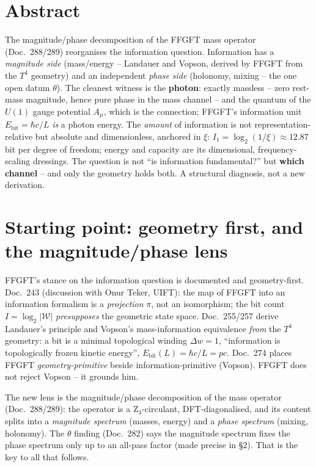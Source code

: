 \section*{Abstract}
The magnitude/phase decomposition of the FFGFT mass operator (Doc.~288/289) reorganises the information
question. Information has a \emph{magnitude side} (mass/energy -- Landauer and Vopson, derived by FFGFT
from the $T^4$ geometry) and an independent \emph{phase side} (holonomy, mixing -- the one open datum
$\theta$). The cleanest witness is the \textbf{photon}: exactly massless -- zero rest-mass magnitude, hence pure phase in the mass channel -- and the quantum of
the $U(1)$ gauge potential $A_\mu$, which is the connection; FFGFT's information unit $E_\text{bit}=\hbar c/L$ \emph{is} a photon
energy. The \emph{amount} of information is not representation-relative but absolute and dimensionless,
anchored in $\xi$: $I_1=\log_2(1/\xi)\approx12.87$ bit per degree of freedom; energy and capacity are its
dimensional, frequency-scaling dressings. The question is not \enquote{is information fundamental?} but
\textbf{which channel} -- and only the geometry holds both. A structural diagnosis, not a new derivation.

\section{Starting point: geometry first, and the magnitude/phase lens}
FFGFT's stance on the information question is documented and geometry-first. Doc.~243 (discussion with
Onur Teker, UIFT): the map of FFGFT into an information formalism is a \emph{projection} $\pi$, not an
isomorphism; the bit count $I=\log_2|\mathcal{W}|$ \emph{presupposes} the geometric state space.
Doc.~255/257 derive Landauer's principle and Vopson's mass-information equivalence \emph{from} the $T^4$
geometry: a bit is a minimal topological winding $\Delta w=1$, \enquote{information is topologically
frozen kinetic energy}, $E_\text{bit}(L)=\hbar c/L=pc$. Doc.~274 places FFGFT \emph{geometry-primitive}
beside information-primitive (Vopson). FFGFT does not reject Vopson -- it grounds him.

The new lens is the magnitude/phase decomposition of the mass operator (Doc.~288/289): the operator is a
Z$_3$-circulant, DFT-diagonalised, and its content splits into a \emph{magnitude spectrum} (masses,
energy) and a \emph{phase spectrum} (mixing, holonomy). The $\theta$ finding (Doc.~282) says the
magnitude spectrum fixes the phase spectrum only up to an all-pass factor (made precise in §2). That is the key to all that follows.

